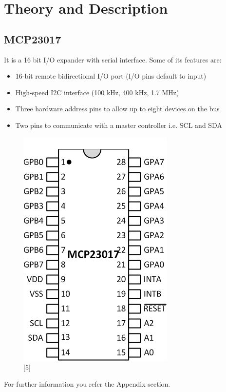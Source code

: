 \documentclass[11pt,a4paper]{article}
\begin{document}
	\newpage
	\section{Theory and Description}
	
	\subsection{MCP23017}
	It is a 16 bit I/O expander with serial interface. Some of its features are:
	\begin{itemize}
		\item 16-bit remote bidirectional I/O port (I/O pins default to input)
		\item High-speed I2C interface (100 kHz, 400 kHz, 1.7 MHz)
		\item Three hardware address pins to allow up to eight devices on the bus
		\item Two pins to communicate with a master controller i.e. SCL and SDA
	\end{itemize}
	
	\begin{figure}[h!]
		\includegraphics[scale=0.7]{mcp23017.png}
		\centering
		\caption{[5]}
	\end{figure}
	
	\flushleft
	For further information you refer the Appendix section.
	
\end{document}
